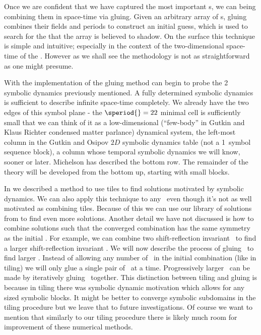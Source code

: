 
Once we are confident that we have captured the most important {\fpo}s, we can being
combining them in space-time via gluing.
Given an arbitrary array of {\fpo}s, gluing combines their fields and periods to
construct an initial guess, which is used to search for the {\po} that the array is
believed to shadow.
On the surface this technique is simple and intuitive; especially in the context
of the two-dimensional space-time of the \KSe. However as we shall see the methodology is not
as straightforward as one might presume. %



With the implementation of the gluing method can begin to
probe the 2\dmn\ {\spt} symbolic dynamics
previously mentioned. A fully determined symbolic dynamics is sufficient
to describe infinite space-time completely.
We already have the two edges of this symbol plane - the $\speriod{}=22$ minimal
cell is sufficiently small that we can think of it as
a low-dimensional (``few-body'' in Gutkin and Klaus
Richter condensed matter parlance)
dynamical system, the left-most column in the Gutkin and
Osipov $2D$ symbolic dynamics {\spt} table (not a
1\dmn\ symbol sequence block), a column whose temporal symbolic dynamics
we will know, sooner or later. Michelson has described the
bottom row. The remainder of the theory will be developed from the
bottom up, starting with small {\spt} blocks.

In  we described a method to use tiles
to find solutions motivated by symbolic dynamics. We can also
apply this technique to any \twots\ even though it's not as
well motivated as combining tiles. Because of this
we can use our library of solutions from 
to find even more solutions. Another detail we have not discussed is
how to combine solutions such that the converged combination has
the same symmetry as the initial \twots. For example, we can
combine two shift-reflection invariant \twots\ to find a larger
shift-reflection invariant \twot. We will
now describe the process of gluing \twots\ to find larger \twots.
Instead of allowing any number of \twots\ in the initial combination
(like in tiling) we will only glue a single pair of \twots\ at a
time. Progressively larger \twots\ can be made by iteratively gluing
\twots\ together. This distinction between tiling and gluing is because
in tiling there was symbolic dynamic motivation which allows for
any sized symbolic blocks. It might be better to converge symbolic
subdomains in the tiling procedure but we leave that to future
investigations. Of course we want to mention that similarly to our tiling procedure
there is likely much room for improvement of these numerical methods.

